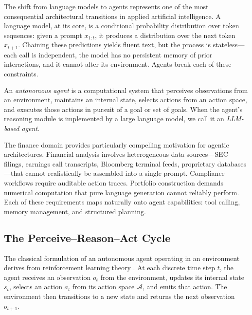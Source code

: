 \begin{deepdive}

The shift from language models to agents represents one of the most consequential
architectural transitions in applied artificial intelligence. A language model, at its
core, is a conditional probability distribution over token sequences: given a prompt
$x_{1:t}$, it produces a distribution over the next token $x_{t+1}$. Chaining these
predictions yields fluent text, but the process is stateless---each call is independent,
the model has no persistent memory of prior interactions, and it cannot alter its
environment. Agents break each of these constraints.

\begin{definition}
\label{def:autonomous-agent}
An \emph{autonomous agent} is a computational system that perceives observations from
an environment, maintains an internal state, selects actions from an action space, and
executes those actions in pursuit of a goal or set of goals. When the agent's reasoning
module is implemented by a large language model, we call it an \emph{LLM-based agent}.
\end{definition}

The finance domain provides particularly compelling motivation for agentic architectures.
Financial analysis involves heterogeneous data sources---SEC filings, earnings call
transcripts, Bloomberg terminal feeds, proprietary databases---that cannot realistically
be assembled into a single prompt. Compliance workflows require auditable action traces.
Portfolio construction demands numerical computation that pure language generation cannot
reliably perform. Each of these requirements maps naturally onto agent capabilities:
tool calling, memory management, and structured planning.


\subsection{The Perceive--Reason--Act Cycle}
\label{subsec:pra-cycle}

The classical formulation of an autonomous agent operating in an environment derives
from reinforcement learning theory \cite{wang2023survey}. At each discrete time step
$t$, the agent receives an observation $o_t$ from the environment, updates its internal
state $s_t$, selects an action $a_t$ from its action space $\mathcal{A}$, and emits
that action. The environment then transitions to a new state and returns the next
observation $o_{t+1}$.


\end{deepdive}

